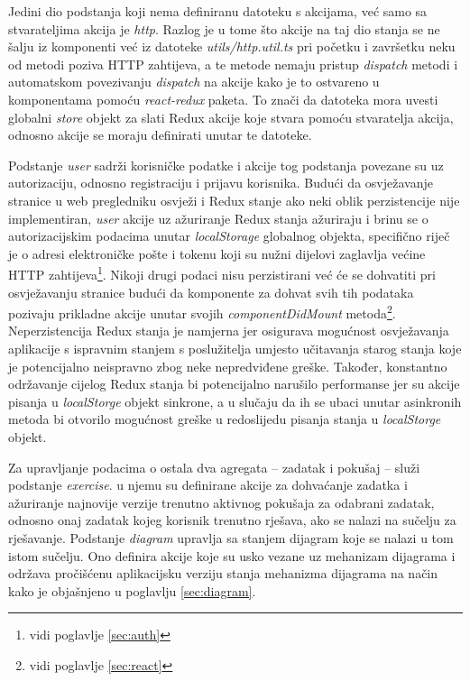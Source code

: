 \documentclass[times, utf8, diplomski, numeric]{fer}
\newcommand{\razmakp}{\vspace{18pt}}
\begin{document}
Jedini dio podstanja koji nema definiranu datoteku s akcijama, već samo sa stvarateljima akcija je \emph{http}.
Razlog je u tome što akcije na taj dio stanja se ne šalju iz komponenti već iz datoteke \emph{utils/http.util.ts} pri početku i završetku neku od metodi poziva HTTP zahtijeva, a te metode nemaju pristup \emph{dispatch} metodi i automatskom povezivanju \emph{dispatch} na akcije kako je to ostvareno u komponentama pomoću \emph{react-redux} paketa. To znači da datoteka mora uvesti globalni \emph{store} objekt za slati Redux akcije koje stvara pomoću stvaratelja akcija, odnosno akcije se moraju definirati unutar te datoteke.

\razmakp

Podstanje \emph{user} sadrži korisničke podatke i akcije tog podstanja povezane su uz autorizaciju, odnosno registraciju i prijavu korisnika.
Budući da osvježavanje stranice u web pregledniku osvježi i Redux stanje ako neki oblik perzistencije nije implementiran, \emph{user} akcije uz ažuriranje Redux stanja ažuriraju i brinu se o autorizacijskim podacima unutar \emph{localStorage} globalnog objekta, specifično riječ je o adresi elektroničke pošte i tokenu koji su nužni dijelovi zaglavlja većine HTTP zahtijeva\footnote{vidi poglavlje \ref{sec:auth}}.
Nikoji drugi podaci nisu perzistirani već će se dohvatiti pri osvježavanju stranice budući da komponente za dohvat svih tih podataka pozivaju prikladne akcije unutar svojih \emph{componentDidMount} metoda\footnote{vidi poglavlje \ref{sec:react}}.
Neperzistencija Redux stanja je namjerna jer osigurava mogućnost osvježavanja aplikacije s ispravnim stanjem s poslužitelja umjesto učitavanja starog stanja koje je potencijalno neispravno zbog neke nepredviđene greške.
Također, konstantno održavanje cijelog Redux stanja bi potencijalno narušilo performanse jer su akcije pisanja u \emph{localStorge} objekt sinkrone, a u slučaju da ih se ubaci unutar asinkronih metoda bi otvorilo mogućnost greške u redoslijedu pisanja stanja u \emph{localStorge} objekt.

Za upravljanje podacima o ostala dva agregata -- zadatak i pokušaj -- služi podstanje \emph{exercise}.
u njemu su definirane akcije za dohvaćanje zadatka i ažuriranje najnovije verzije trenutno aktivnog pokušaja za odabrani zadatak, odnosno onaj zadatak kojeg korisnik trenutno rješava, ako se nalazi na sučelju za rješavanje.
Podstanje \emph{diagram} upravlja sa stanjem dijagram koje se nalazi u tom istom sučelju.
Ono definira akcije koje su usko vezane uz mehanizam dijagrama i održava pročišćenu aplikacijsku verziju stanja mehanizma dijagrama na način kako je objašnjeno u poglavlju \ref{sec:diagram}.
\end{document}
